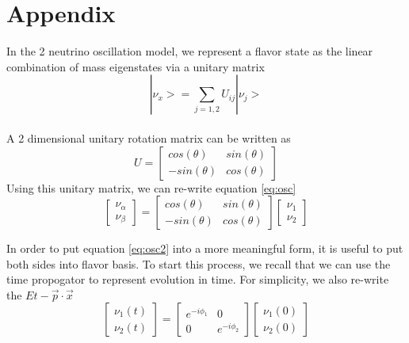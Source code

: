 \documentclass[12pt]{article}
\begin{document}
%

\newpage
\appendix
\section{Appendix}
In the 2 neutrino oscillation model, we represent a flavor state as the linear combination of mass eigenstates via a unitary matrix
\begin{equation} \label{eq:osc}
|\nu_x> = \sum_{j=1,2} U_{ij} |\nu_j>  
\end{equation}
\\ A 2 dimensional unitary rotation matrix can be written as 
\begin{equation}
U = \begin{bmatrix}
cos(\theta) & sin(\theta)
\\ -sin(\theta)& cos(\theta)
\end{bmatrix}
\end{equation}
Using this unitary matrix, we can re-write equation \ref{eq:osc} 
\begin{equation} \label{eq:osc2}
 \begin{bmatrix}
 \nu_\alpha
 \\ \nu_\beta
 \end{bmatrix}
 = \begin{bmatrix}
cos(\theta) & sin(\theta)
\\ -sin(\theta)& cos(\theta)
\end{bmatrix} 
 \begin{bmatrix}
 \nu_1
 \\ \nu_2
 \end{bmatrix}
\end{equation}


In order to put equation \ref{eq:osc2} into a more meaningful form, it is useful to put both sides into flavor basis. To start this process, we recall that we can use the time propogator to represent evolution in time. For simplicity, we also re-write the $Et - \vec{p}\cdot\vec{x}$
\begin{equation} \label{eq:prop}
 \begin{bmatrix}
 \nu_1(t)
 \\ \nu_2(t)
 \end{bmatrix}
 = \begin{bmatrix}
e^{-i\phi_1} & 0
\\ 0 & e^{-i\phi_2}
\end{bmatrix} 
 \begin{bmatrix}
 \nu_1(0)
 \\ \nu_2(0)
 \end{bmatrix}
\end{equation}
\end{document}

